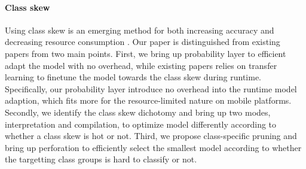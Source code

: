 \documentclass[pageno]{jpaper}
\begin{document}
\paragraph{Class skew}
Using class skew is an emerging method for both increasing accuracy and decreasing resource consumption \cite{han2016mcdnn, kang2017noscope, shen2016fast}. Our paper is distinguished from existing papers from two main points. First, we bring up probability layer to efficient adapt the model with no overhead, while existing papers relies on transfer learning to finetune the model towards the class skew during runtime. Specifically, our probability layer introduce no overhead into the runtime model adaption, which fits more for the resource-limited nature on mobile platforms. Secondly, we identify the class skew dichotomy and bring up two modes, interpretation and compilation, to optimize model differently according to whether a class skew is hot or not. Third, we propose class-specific pruning and bring up perforation to efficiently select the smallest model according to whether the targetting class groups is hard to classify or not.


\end{document}
